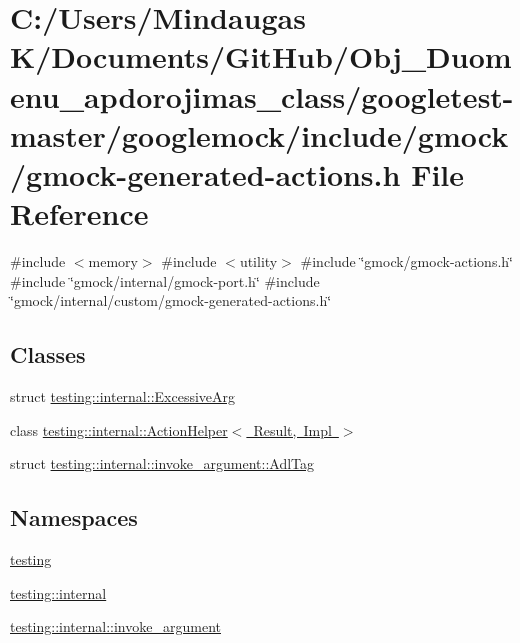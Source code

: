 \hypertarget{googletest-master_2googlemock_2include_2gmock_2gmock-generated-actions_8h}{}\section{C\+:/\+Users/\+Mindaugas K/\+Documents/\+Git\+Hub/\+Obj\+\_\+\+Duomenu\+\_\+apdorojimas\+\_\+class/googletest-\/master/googlemock/include/gmock/gmock-\/generated-\/actions.h File Reference}
\label{googletest-master_2googlemock_2include_2gmock_2gmock-generated-actions_8h}
{\ttfamily \#include $<$memory$>$}\newline
{\ttfamily \#include $<$utility$>$}\newline
{\ttfamily \#include \char`\"{}gmock/gmock-\/actions.\+h\char`\"{}}\newline
{\ttfamily \#include \char`\"{}gmock/internal/gmock-\/port.\+h\char`\"{}}\newline
{\ttfamily \#include \char`\"{}gmock/internal/custom/gmock-\/generated-\/actions.\+h\char`\"{}}\newline
\subsection*{Classes}
\begin{DoxyCompactItemize}
\item 
struct \mbox{\hyperlink{structtesting_1_1internal_1_1_excessive_arg}{testing\+::internal\+::\+Excessive\+Arg}}
\item 
class \mbox{\hyperlink{classtesting_1_1internal_1_1_action_helper}{testing\+::internal\+::\+Action\+Helper$<$ Result, Impl $>$}}
\item 
struct \mbox{\hyperlink{structtesting_1_1internal_1_1invoke__argument_1_1_adl_tag}{testing\+::internal\+::invoke\+\_\+argument\+::\+Adl\+Tag}}
\end{DoxyCompactItemize}
\subsection*{Namespaces}
\begin{DoxyCompactItemize}
\item 
 \mbox{\hyperlink{namespacetesting}{testing}}
\item 
 \mbox{\hyperlink{namespacetesting_1_1internal}{testing\+::internal}}
\item 
 \mbox{\hyperlink{namespacetesting_1_1internal_1_1invoke__argument}{testing\+::internal\+::invoke\+\_\+argument}}
\end{DoxyCompactItemize}
